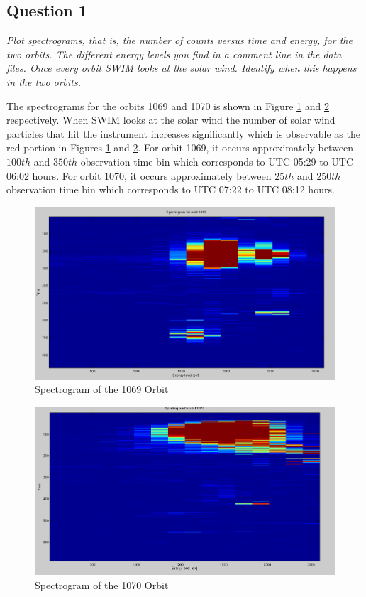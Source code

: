 \documentclass{article}
\begin{document}
\subsection{Question 1}
\textit{Plot spectrograms, that is, the number of counts versus time and energy, for the
two orbits. The different energy levels you find in a comment line in the data files.
Once every orbit SWIM looks at the solar wind. Identify when this happens in the two
orbits.}

The spectrograms for the orbits 1069 and 1070 is shown in Figure \ref{fig:spectrogram_1069} and \ref{fig:spectrogram_1070} respectively. When SWIM looks at the solar wind the number of solar wind particles that hit the instrument increases significantly which is observable as the red portion in Figures \ref{fig:spectrogram_1069} and \ref{fig:spectrogram_1070}. For orbit 1069, it occurs approximately between $100th$ and $350th$ observation time bin which corresponds to UTC 05:29 to UTC 06:02 hours. For orbit 1070, it occurs approximately between $25th$ and $250th$ observation time bin which corresponds to UTC 07:22 to UTC 08:12 hours.

\begin{figure}[h!]
\centering
\includegraphics[scale=0.35]{Figures/spectrogram_1069.png}
\caption{Spectrogram of the 1069 Orbit}
\label{fig:spectrogram_1069}
\end{figure}

\begin{figure}[h!]
\centering
\includegraphics[scale=0.35]{Figures/spectrogram_1070.png}
\caption{Spectrogram of the 1070 Orbit}
\label{fig:spectrogram_1070}
\end{figure}
\end{document}
